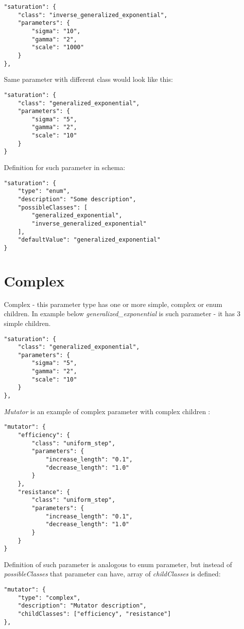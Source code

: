 \begin{lstlisting}[label=list:enum-param-ex1,caption=Enum parameter example, basicstyle=\footnotesize\ttfamily]
"saturation": {
    "class": "inverse_generalized_exponential",
    "parameters": {
        "sigma": "10",
        "gamma": "2",
        "scale": "1000"
    }
},
\end{lstlisting}

Same parameter with different class would look like this:
\begin{lstlisting}[label=list:enum-param-ex2,caption=Enum parameter example, basicstyle=\footnotesize\ttfamily]
"saturation": {
    "class": "generalized_exponential",
    "parameters": {
        "sigma": "5",
        "gamma": "2",
        "scale": "10"
    }
}
\end{lstlisting}
Definition for such parameter in schema:
\begin{lstlisting}[label=list:enum-param-def,caption=Enum parameter definition, basicstyle=\footnotesize\ttfamily]
"saturation": {
    "type": "enum",
    "description": "Some description",
    "possibleClasses": [
        "generalized_exponential",
        "inverse_generalized_exponential"
    ],
    "defaultValue": "generalized_exponential"
}
\end{lstlisting}
\section{Complex}
Complex - this parameter type has one or more simple, complex or enum children. In example below \textit{generalized\_exponential} is such parameter - it has 3 simple children.
\begin{lstlisting}[label=list:complex-param-ex,caption=Complex parameter example, basicstyle=\footnotesize\ttfamily]
"saturation": {
    "class": "generalized_exponential",
    "parameters": {
        "sigma": "5",
        "gamma": "2",
        "scale": "10"
    }
},
\end{lstlisting}
\textit{Mutator} is an example of complex parameter with complex children :
\begin{lstlisting}[label=list:complex-ex,caption=Complex parameter example, basicstyle=\footnotesize\ttfamily]
"mutator": {
    "efficiency": {
        "class": "uniform_step",
        "parameters": {
            "increase_length": "0.1",
            "decrease_length": "1.0"
        }
    },
    "resistance": {
        "class": "uniform_step",
        "parameters": {
            "increase_length": "0.1",
            "decrease_length": "1.0"
        }
    }
}
\end{lstlisting}
Definition of such parameter is analogous to enum parameter, but instead of \textit{possibleClasses} that parameter can have, array of \textit{childClasses} is defined:
\begin{lstlisting}[label=list:complex-def,caption=Complex parameter definition, basicstyle=\footnotesize\ttfamily]
"mutator": {
    "type": "complex",
    "description": "Mutator description",
    "childClasses": ["efficiency", "resistance"]
},
\end{lstlisting}